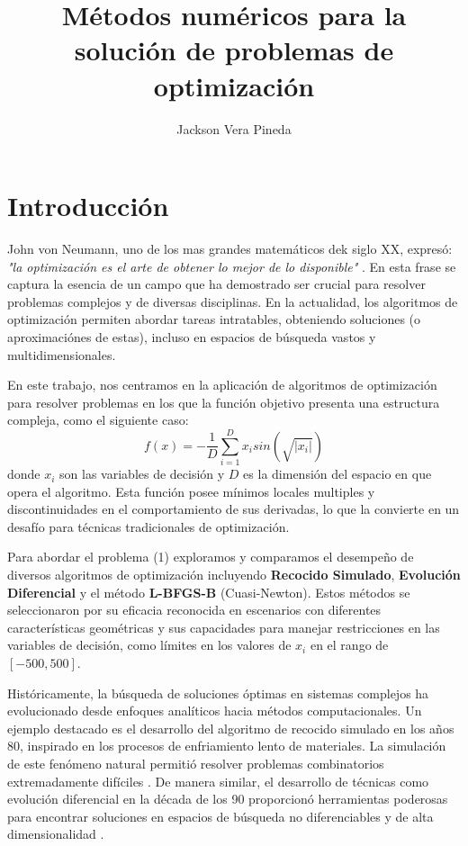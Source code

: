 \documentclass[10pt,a4paper,twocolumn]{article}
\title{Métodos numéricos para la solución de problemas de optimización}
\author{Jackson Vera Pineda}
\date{}
\begin{document}
	




	\maketitle
	
	
	\section{Introducción}
	
	John von Neumann, uno de los mas grandes matemáticos dek siglo XX, expresó: \emph{"la optimización es el arte de obtener lo mejor de lo disponible"} \cite{von2018mathematical}. En esta frase se captura la esencia de un campo que ha demostrado ser crucial para resolver problemas complejos y de diversas disciplinas. En la actualidad, los algoritmos de optimización permiten abordar tareas intratables, obteniendo soluciones (o aproximaciónes de estas), incluso en espacios de búsqueda vastos y multidimensionales.
	
	En este trabajo, nos centramos en la aplicación de algoritmos de optimización para resolver problemas en los que la función objetivo presenta una estructura compleja, como el siguiente caso:
	\begin{equation}
		f(x) = - \frac{1}{D} \sum_{i=1}^D x_i sin(\sqrt{|x_i|})
	\end{equation}
	donde $x_i$ son las variables de decisión y $D$ es la dimensión del espacio en que opera el algoritmo. Esta función posee mínimos locales multiples y discontinuidades en el comportamiento de sus derivadas, lo que la convierte en un desafío para técnicas tradicionales de optimización.
	
	Para abordar el problema (1) exploramos y comparamos el desempeño de diversos algoritmos de optimización incluyendo \textbf{Recocido Simulado}, \textbf{Evolución Diferencial} y el método \textbf{L-BFGS-B} (Cuasi-Newton). Estos métodos se seleccionaron por su eficacia reconocida en escenarios con diferentes características geométricas y sus capacidades para manejar restricciones en las variables de decisión, como límites en los valores de \(x_i\) en el rango de \([-500, 500]\).
	
	Históricamente, la búsqueda de soluciones óptimas en sistemas complejos ha evolucionado desde enfoques analíticos hacia métodos computacionales. Un ejemplo destacado es el desarrollo del algoritmo de recocido simulado en los años 80, inspirado en los procesos de enfriamiento lento de materiales. La simulación de este fenómeno natural permitió resolver problemas combinatorios extremadamente difíciles \cite{kirkpatrick1983optimization}. De manera similar, el desarrollo de técnicas como evolución diferencial en la década de los 90 proporcionó herramientas poderosas para encontrar soluciones en espacios de búsqueda no diferenciables y de alta dimensionalidad \cite{storn1997differential}.
	
\end{document}
